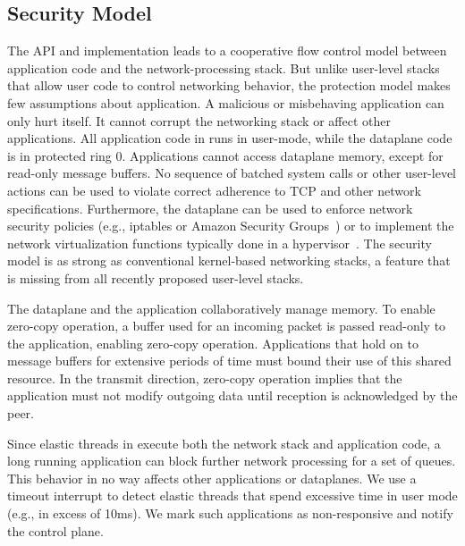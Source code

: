 \subsection{Security Model}
\label{sec:impl:coop}


The \ix API and implementation leads to a cooperative flow control
model between application code and the network-processing stack.  But
unlike user-level stacks that allow user code to control networking
behavior, the \ix protection model makes few assumptions about
application. A malicious or misbehaving application can only hurt
itself. It cannot corrupt the networking stack or affect other
applications. All application code in \ix runs in user-mode, while the
dataplane code is in protected ring 0. Applications cannot access
dataplane memory, except for read-only message buffers.  No sequence
of batched system calls or other user-level actions can be used to
violate correct adherence to TCP and other network specifications.
Furthermore, the dataplane can be used to enforce network security
policies (e.g., iptables or Amazon Security
Groups~\cite{url:amazon-sg}) or to implement the network
virtualization functions typically done in a
hypervisor~\cite{nsdi:nsx}. The \ix security model is as strong as
conventional kernel-based networking stacks, a feature that is missing
from all recently proposed user-level stacks.

The \ix dataplane and the application collaboratively manage
memory. To enable zero-copy operation, a buffer used for an incoming
packet is passed read-only to the application, enabling zero-copy
operation. Applications that hold on to message buffers for extensive
periods of time must bound their use of this shared resource.  In the
transmit direction, zero-copy operation implies that the application
must not modify outgoing data until reception is acknowledged by the
peer.

Since elastic threads in \ix execute both the network stack and
application code, a long running application can block further network
processing for a set of queues. This behavior in no way affects other
applications or dataplanes. We use a timeout interrupt to detect
elastic threads that spend excessive time in user mode (e.g., in
excess of 10ms). We mark such applications as non-responsive and
notify the control plane.

